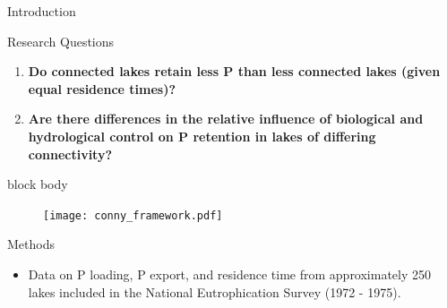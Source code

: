 \documentclass[final,hyperref={pdfpagelabels=false}]{beamer}
\begin{document}
\begin{frame}[t]
\begin{columns}[t]
\begin{column}{.465\textwidth}
\begin{block}{Introduction}
\vspace{0.5em}
\end{block}
\vspace{1em}
\begin{block}{Research Questions}

\begin{enumerate} \large 
\item \textbf{Do connected lakes retain less P than less connected lakes (given equal residence times)?}
\vspace{1em}
\item \textbf{Are there differences in the relative influence of biological and hydrological control on P retention in lakes of differing connectivity?}
\end{enumerate}

\vspace{1em}
{
\begin{beamercolorbox}[wd=\textwidth,rounded=true]{block body}

\begin{figure}
  \texttt{[image: conny\_framework.pdf]}
\end{figure}

\end{beamercolorbox}
}
\vspace{0.5em}
\end{block}


\vspace{1em}

\begin{block}{Methods}

\begin{itemize}
\item Data on P loading, P export, and residence time from approximately 250 lakes included in the National Eutrophication Survey (1972 - 1975)\cite{StachelekNationalEutrophicationSurvey2017}.
\end{itemize}

\end{block}

\end{column} %


\end{columns}
\end{frame}
\end{document}
